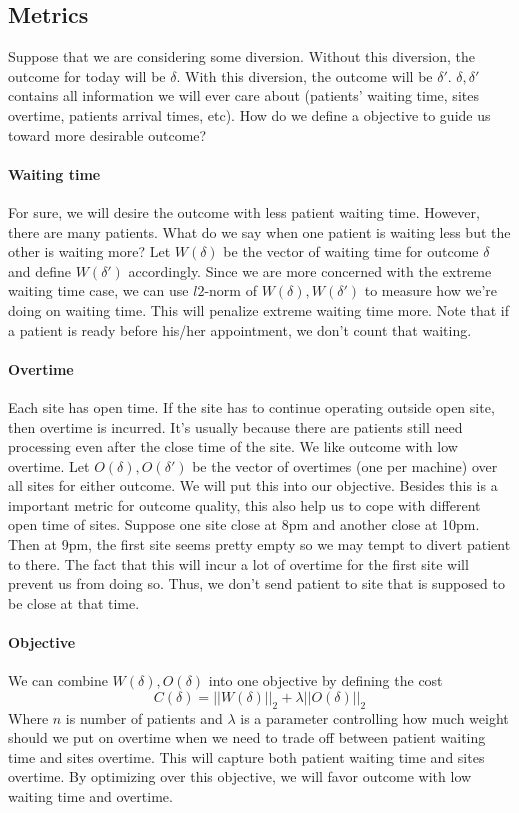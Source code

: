\subsection{Metrics}

Suppose that we are considering some diversion. Without this diversion, the outcome for today will be $\delta$. With this diversion, the outcome will be $\delta'$. $\delta, \delta'$ contains all information we will ever care about (patients' waiting time, sites overtime, patients arrival times, etc). How do we define a objective to guide us toward more desirable outcome?

\paragraph{Waiting time} For sure, we will desire the outcome with less patient waiting time. However, there are many patients. What do we say when one patient is waiting less but the other is waiting more? Let $W(\delta)$ be the vector of waiting time for outcome $\delta$ and define $W(\delta')$ accordingly. Since we are more concerned with the extreme waiting time case, we can use $l2$-norm of $W(\delta), W(\delta')$ to measure how we're doing on waiting time. This will penalize extreme waiting time more. Note that if a patient is ready before his/her appointment, we don't count that waiting.

\paragraph{Overtime} Each site has open time. If the site has to continue operating outside open site, then overtime is incurred. It's usually because there are patients still need processing even after the close time of the site. We like outcome with low overtime. Let $O(\delta), O(\delta')$ be the vector of overtimes (one per machine) over all sites for either outcome. We will put this into our objective. Besides this is a important metric for outcome quality, this also help us to cope with different open time of sites. Suppose one site close at 8pm and another close at 10pm. Then at 9pm, the first site seems pretty empty so we may tempt to divert patient to there. The fact that this will incur a lot of overtime for the first site will prevent us from doing so. Thus, we don't send patient to site that is supposed to be close at that time.

\paragraph{Objective} We can combine $W(\delta), O(\delta)$ into one objective by defining the cost
\[  C(\delta) = ||W(\delta)||_2 + \lambda ||O(\delta)||_2 \]
Where $n$ is number of patients and $\lambda$ is a parameter controlling
how much weight should we put on overtime when we need to trade off
between patient waiting time and sites overtime.
This will capture both patient waiting time and sites overtime.
By optimizing over this objective, we will favor outcome with low waiting time and overtime.

